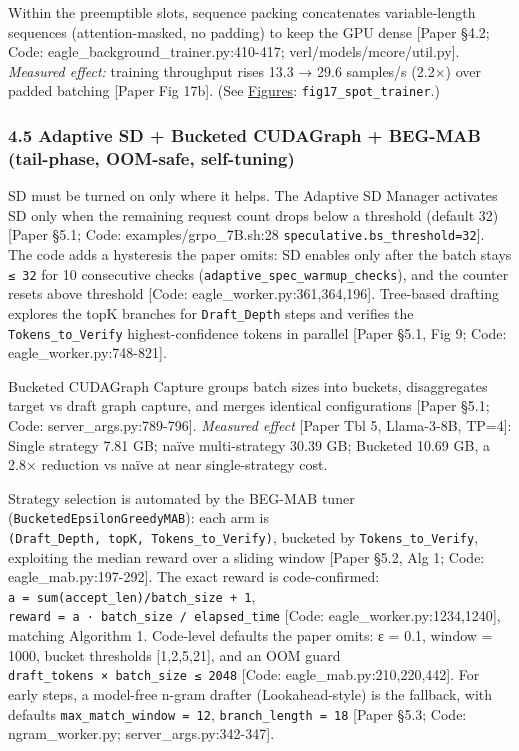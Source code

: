 \documentclass[
  11pt,
  letterpaper,
]{article}
\begin{document}
Within the preemptible slots, sequence packing concatenates
variable-length sequences (attention-masked, no padding) to keep the GPU
dense {[}Paper §4.2; Code: eagle\_background\_trainer.py:410-417;
verl/models/mcore/util.py{]}. \emph{Measured effect:} training
throughput rises 13.3 → 29.6 samples/s (2.2×) over padded batching
{[}Paper Fig 17b{]}. (See \hyperref[figures]{Figures}:
\texttt{fig17\_spot\_trainer}.)

\subsubsection{4.5 Adaptive SD + Bucketed CUDAGraph + BEG-MAB
(tail-phase, OOM-safe,
self-tuning)}\label{adaptive-sd-bucketed-cudagraph-beg-mab-tail-phase-oom-safe-self-tuning}

SD must be turned on only where it helps. The Adaptive SD Manager
activates SD only when the remaining request count drops below a
threshold (default 32) {[}Paper §5.1; Code: examples/grpo\_7B.sh:28
\texttt{speculative.bs\_threshold=32}{]}. The code adds a hysteresis the
paper omits: SD enables only after the batch stays \texttt{≤\ 32} for 10
consecutive checks (\texttt{adaptive\_spec\_warmup\_checks}), and the
counter resets above threshold {[}Code: eagle\_worker.py:361,364,196{]}.
Tree-based drafting explores the topK branches for \texttt{Draft\_Depth}
steps and verifies the \texttt{Tokens\_to\_Verify} highest-confidence
tokens in parallel {[}Paper §5.1, Fig 9; Code:
eagle\_worker.py:748-821{]}.

Bucketed CUDAGraph Capture groups batch sizes into buckets,
disaggregates target vs draft graph capture, and merges identical
configurations {[}Paper §5.1; Code: server\_args.py:789-796{]}.
\emph{Measured effect} {[}Paper Tbl 5, Llama-3-8B, TP=4{]}: Single
strategy 7.81 GB; naïve multi-strategy 30.39 GB; Bucketed 10.69 GB, a
2.8× reduction vs naïve at near single-strategy cost.

Strategy selection is automated by the BEG-MAB tuner
(\texttt{BucketedEpsilonGreedyMAB}): each arm is
\texttt{(Draft\_Depth,\ topK,\ Tokens\_to\_Verify)}, bucketed by
\texttt{Tokens\_to\_Verify}, exploiting the median reward over a sliding
window {[}Paper §5.2, Alg 1; Code: eagle\_mab.py:197-292{]}. The exact
reward is code-confirmed:
\texttt{a\ =\ sum(accept\_len)/batch\_size\ +\ 1},
\texttt{reward\ =\ a\ ·\ batch\_size\ /\ elapsed\_time} {[}Code:
eagle\_worker.py:1234,1240{]}, matching Algorithm 1. Code-level defaults
the paper omits: ε = 0.1, window = 1000, bucket thresholds
{[}1,2,5,21{]}, and an OOM guard
\texttt{draft\_tokens\ ×\ batch\_size\ ≤\ 2048} {[}Code:
eagle\_mab.py:210,220,442{]}. For early steps, a model-free n-gram
drafter (Lookahead-style) is the fallback, with defaults
\texttt{max\_match\_window\ =\ 12}, \texttt{branch\_length\ =\ 18}
{[}Paper §5.3; Code: ngram\_worker.py; server\_args.py:342-347{]}.
\end{document}

